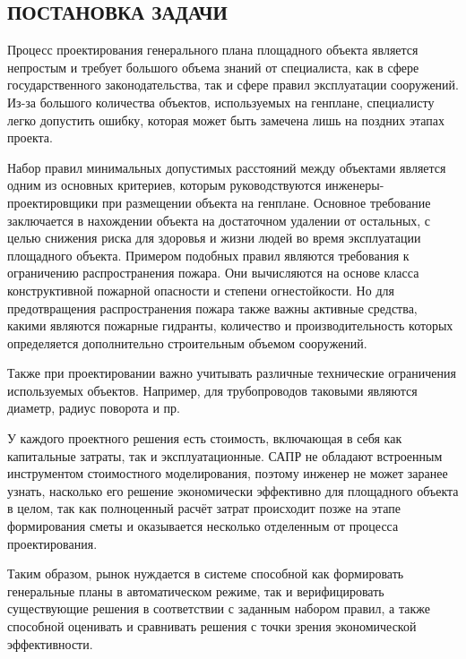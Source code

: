 \begin{center}
    \section*{\large{ПОСТАНОВКА ЗАДАЧИ}}
\end{center}


Процесс проектирования генерального плана площадного объекта является непростым
и требует большого объема знаний от специалиста, как в сфере государственного законодательства,
так и сфере правил эксплуатации сооружений.
Из-за большого количества объектов, используемых на генплане, специалисту легко допустить ошибку,
которая может быть замечена лишь на поздних этапах проекта.

Набор правил минимальных допустимых расстояний между объектами является одним из основных критериев,
которым руководствуются инженеры-проектировщики при размещении объекта на генплане.
Основное требование заключается в нахождении объекта на достаточном удалении от остальных,
с целью снижения риска для здоровья и жизни людей во время эксплуатации площадного объекта.
Примером подобных правил являются
требования к ограничению распространения пожара\cite{Fire}.
Они вычисляются на основе класса конструктивной пожарной опасности и степени огнестойкости.
Но для предотвращения распространения пожара также важны
активные средства, какими являются пожарные гидранты, количество и производительность которых определяется
дополнительно строительным объемом сооружений.

Также при проектировании важно учитывать различные технические ограничения используемых объектов.
Например, для трубопроводов таковыми являются диаметр, радиус поворота и пр.

У каждого проектного решения есть стоимость, включающая в себя как капитальные затраты, так и эксплуатационные.
САПР не обладают встроенным инструментом стоимостного моделирования,
поэтому инженер не может заранее узнать,
насколько его решение экономически эффективно для площадного объекта в целом,
так как полноценный расчёт затрат происходит позже на этапе формирования сметы
и оказывается несколько отделенным от процесса проектирования.

Таким образом, рынок нуждается в системе способной как формировать генеральные планы в автоматическом режиме,
так и верифицировать существующие решения в соответствии с заданным набором правил,
а также способной оценивать и сравнивать решения с точки зрения экономической эффективности.

